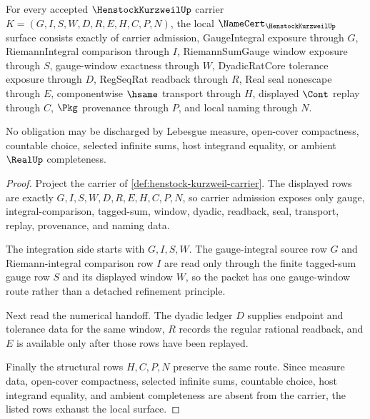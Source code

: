 \begin{theorem}
\label{thm:henstock-kurzweil-namecert-obligations}
For every accepted $\HenstockKurzweilUp$ carrier $K=(G,I,S,W,D,R,E,H,C,P,N)$, the local $\NameCert_{\HenstockKurzweilUp}$ surface consists exactly of carrier admission, GaugeIntegral exposure through $G$, RiemannIntegral comparison through $I$, RiemannSumGauge window exposure through $S$, gauge-window exactness through $W$, DyadicRatCore tolerance exposure through $D$, RegSeqRat readback through $R$, Real seal nonescape through $E$, componentwise $\hsame$ transport through $H$, displayed $\Cont$ replay through $C$, $\Pkg$ provenance through $P$, and local naming through $N$.

No obligation may be discharged by Lebesgue measure, open-cover compactness, countable choice, selected infinite sums, host integrand equality, or ambient $\RealUp$ completeness.
\end{theorem}
\begin{proof}
Project the carrier of \autoref{def:henstock-kurzweil-carrier}. The displayed rows are exactly $G,I,S,W,D,R,E,H,C,P,N$, so carrier admission exposes only gauge, integral-comparison, tagged-sum, window, dyadic, readback, seal, transport, replay, provenance, and naming data.

The integration side starts with $G,I,S,W$. The gauge-integral source row $G$ and Riemann-integral comparison row $I$ are read only through the finite tagged-sum gauge row $S$ and its displayed window $W$, so the packet has one gauge-window route rather than a detached refinement principle.

Next read the numerical handoff. The dyadic ledger $D$ supplies endpoint and tolerance data for the same window, $R$ records the regular rational readback, and $E$ is available only after those rows have been replayed.

Finally the structural rows $H,C,P,N$ preserve the same route. Since measure data, open-cover compactness, selected infinite sums, countable choice, host integrand equality, and ambient completeness are absent from the carrier, the listed rows exhaust the local surface.
\end{proof}

